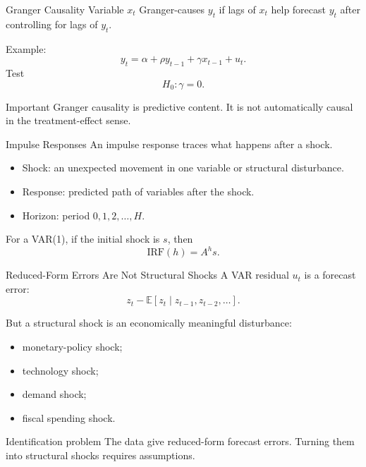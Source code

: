 \documentclass[11pt,aspectratio=169]{beamer}
\newcommand{\E}{\mathbb{E}}
\newcommand{\IRF}{\mathrm{IRF}}
\newcommand{\derivbutton}[1]{\vspace{0.4em}\hfill\hyperlink{app:#1}{\beamerbutton{Appendix details}}}
\begin{document}
\begin{frame}{Granger Causality}
  Variable \(x_t\) Granger-causes \(y_t\) if lags of \(x_t\) help forecast \(y_t\) after controlling for lags of \(y_t\).

  Example:
  \[
    y_t=\alpha+\rho y_{t-1}+\gamma x_{t-1}+u_t.
  \]
  Test
  \[
    H_0:\gamma=0.
  \]

  \begin{block}{Important}
    Granger causality is predictive content. It is not automatically causal in the treatment-effect sense.
  \end{block}
\end{frame}

\begin{frame}{Impulse Responses}
  \hypertarget{main:irf}{}
  An impulse response traces what happens after a shock.

  \begin{itemize}
    \item Shock: an unexpected movement in one variable or structural disturbance.
    \item Response: predicted path of variables after the shock.
    \item Horizon: period \(0,1,2,\ldots,H\).
  \end{itemize}

  For a VAR(1), if the initial shock is \(s\), then
  \[
    \IRF(h)=A^h s.
  \]

  \derivbutton{irf-recursion}
\end{frame}

\begin{frame}{Reduced-Form Errors Are Not Structural Shocks}
  A VAR residual \(u_t\) is a forecast error:
  \[
    z_t-\E[z_t\mid z_{t-1},z_{t-2},\ldots].
  \]

  But a structural shock is an economically meaningful disturbance:
  \begin{itemize}
    \item monetary-policy shock;
    \item technology shock;
    \item demand shock;
    \item fiscal spending shock.
  \end{itemize}

  \begin{block}{Identification problem}
    The data give reduced-form forecast errors. Turning them into structural shocks requires assumptions.
  \end{block}
\end{frame}
\end{document}
